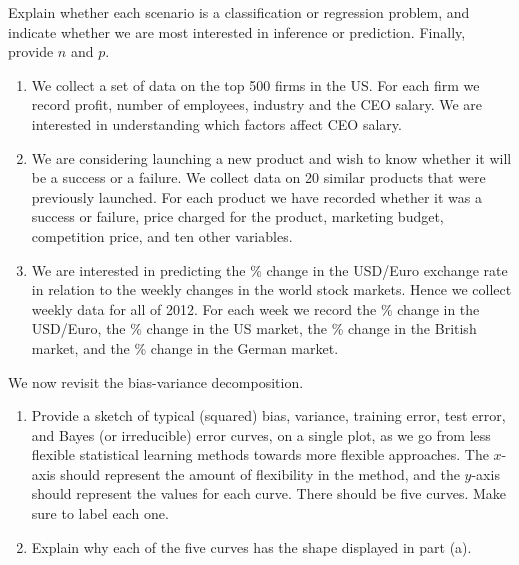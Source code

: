 \documentclass[12pt]{report}
\begin{document}
\begin{exercise}
Explain whether each scenario is a classification or regression problem, and indicate whether we are most interested in inference or prediction. Finally, provide $n$ and $p$.
\begin{enumerate}
    \item[(a)] We collect a set of data on the top 500 firms in the US. For each firm we record profit, number of employees, industry and the CEO salary. We are interested in understanding which factors affect CEO salary.
    \item[(b)] We are considering launching a new product and wish to know whether it will be a success or a failure. We collect data on 20 similar products that were previously launched. For each product we have recorded whether it was a success or failure, price charged for the product, marketing budget, competition price, and ten other variables.
    \item[(c)] We are interested in predicting the \% change in the USD/Euro exchange rate in relation to the weekly changes in the world stock markets. Hence we collect weekly data for all of 2012. For each week we record the \% change in the USD/Euro, the \% change in the US market, the \% change in the British market, and the \% change in the German market.
\end{enumerate}
\end{exercise}

\begin{exercise}
We now revisit the bias-variance decomposition.
\begin{enumerate}
    \item[(a)] Provide a sketch of typical (squared) bias, variance, training error, test error, and Bayes (or irreducible) error curves, on a single plot, as we go from less flexible statistical learning methods towards more flexible approaches. The $x$-axis should represent the amount of flexibility in the method, and the $y$-axis should represent the values for each curve. There should be five curves. Make sure to label each one.
    \item[(b)] Explain why each of the five curves has the shape displayed in part (a).
\end{enumerate}
\end{exercise}
\end{document}
